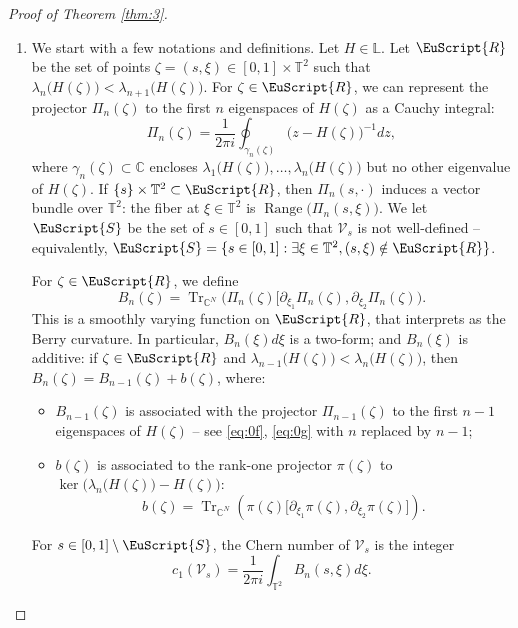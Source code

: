 \documentclass[JEP,XML,SOM,Unicode,NoFloatCountersInSection]{cedram}
\let\pazocal\EuScript
\let\sep:
\theoremstyle{definition}
\DeclareMathOperator{\Range}{Range}
\DeclareMathOperator{\Tr}{Tr}
\newcommand{\RRR}{\pazocal{R}}
\newcommand{\SSS}{{\pazocal{S}}}
\newcommand{\VVV}{{\mathscr{V}}}
\newcommand{\C}{\mathbb{C}}
\newcommand{\Ll}{\mathbb{L}}
\newcommand{\Tt}{{\mathbb{T}}}
\let\p\partial
\begin{document}
\skpt
\begin{proof}[Proof of Theorem \ref{thm:3}]
\begin{enumerate}
\item
We start with a few notations and definitions. Let $H \in \Ll$. Let $\RRR$ be the set of points $\zeta = (s,\xi) \in [0,1] \times \Tt^2$ such that $\lambda_n\bigl( H(\zeta) \bigr) < \lambda_{n+1}\bigl(H(\zeta)\bigr)$. For $\zeta \in \RRR$, we can represent the projector $\Pi_n(\zeta)$ to the first $n$ eigenspaces of $H(\zeta)$ as a Cauchy integral:
\begin{equation}\label{eq:0f}
\Pi_n(\zeta) =
\dfrac{1}{2\pi i}\oint_{\gamma_n(\zeta)} \bigl( z - H(\zeta) \bigr)^{-1} dz,
\end{equation}
where $\gamma_n(\zeta) \subset \C$ encloses $\lambda_1\bigl( H(\zeta) \bigr), \dots, \lambda_n\bigl( H(\zeta) \bigr)$ but no other eigenvalue of $H(\zeta)$. If $\{s \} \times \Tt^2 \subset \RRR$, then $\Pi_n(s,\cdot)$ induces a vector bundle over $\Tt^2$: the fiber at $\xi \in \Tt^2$ is $\Range\bigl( \Pi_n(s,\xi)\bigr)$. We let $\SSS$ be the set of $s \in [0,1]$ such that $\VVV_s$ is not well-defined -- equivalently, $\SSS = \{s \in [0,1]\sep\exists \xi \in \Tt^2, (s,\xi) \notin \RRR\}$.

For $\zeta \in \RRR$, we define
\begin{equation}\label{eq:0g}
B_n(\zeta) = \Tr_{\C^N} \bigl( \Pi_n(\zeta) \bigl[ \p_{\xi_1} \Pi_n(\zeta), \p_{\xi_2} \Pi_n(\zeta) \bigr).
\end{equation}
This is a smoothly varying function on $\RRR$, that interprets as the Berry curvature. In particular, $B_n(\xi)d\xi$ is a two-form; and $B_n(\xi)$ is additive: if $\zeta \in \RRR$ and $\lambda_{n-1}\bigl( H(\zeta) \bigr) < \lambda_n\bigl(H(\zeta)\bigr)$, then $B_n(\zeta) = B_{n-1}(\zeta) + b(\zeta)$, where:
\begin{itemize}
\item $B_{n-1}(\zeta)$ is associated with the projector $\Pi_{n-1}(\zeta)$ to the first $n-1$ eigenspaces of $H(\zeta)$ -- see \eqref{eq:0f}, \eqref{eq:0g} with $n$ replaced by $n-1$;
\item $b(\zeta)$ is associated to the rank-one projector $\pi(\zeta)$ to $\ker\bigl( \lambda_n \bigl(H(\zeta)\bigr) - H(\zeta) \bigr)$:
\begin{equation}\label{eq:0y}
b(\zeta) = \Tr_{\C^N} \left( \pi(\zeta) \bigl[ \p_{\xi_1} \pi(\zeta), \p_{\xi_2} \pi(\zeta) \bigr]\right).
\end{equation}
\end{itemize}
For $s \in [0,1] \setminus \SSS$, the Chern number of $\VVV_s$ is the integer
\begin{equation*}
c_1(\VVV_s) = \dfrac{1}{2\pi i} \int_{\Tt^2} B_n(s,\xi) d\xi.
\end{equation*}


\end{enumerate}
\end{proof}
\end{document}
